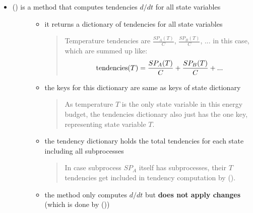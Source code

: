 \documentclass[a4paper,10pt,english]{sphinxmanual}
\begin{document}
\begin{itemize}
\item {} \begin{description}
\item[{{\hyperref[api/climlab.process:climlab.process.time_dependent_process.TimeDependentProcess.compute]{\emph{}}} () is a method that computes tendencies \(d/dt\) for all state variables}] \leavevmode\begin{itemize}
\item {} 
it returns a dictionary of tendencies for all state variables
\begin{quote}

Temperature tendencies are \(\frac{SP_A(T)}{C}\), \(\frac{SP_B(T)}{C}\), ... in this case, which are summed up like:
\begin{gather}
\begin{split}\textrm{tendencies}(T) = \frac{SP_A(T)}{C} + \frac{SP_B(T)}{C} + ...\end{split}\notag
\end{gather}\end{quote}

\item {} 
the keys for this dictionary are same as keys of state dictionary
\begin{quote}

As temperature \(T\) is the only state variable in this energy budget, the tendencies dictionary also just has the one key, representing state variable \(T\).
\end{quote}

\item {} 
the tendency dictionary holds the total tendencies for each state including all subprocesses
\begin{quote}

In case subprocess \(SP_A\) itself has subprocesses, their \(T\) tendencies get included in tendency computation by {\hyperref[api/climlab.process:climlab.process.time_dependent_process.TimeDependentProcess.compute]{\emph{}}} ().
\end{quote}

\item {} 
the method only computes \(d/dt\) but \textbf{does not apply changes} (which is done by {\hyperref[api/climlab.process:climlab.process.time_dependent_process.TimeDependentProcess.step_forward]{\emph{}}} ())


\end{itemize}
\end{description}
\end{itemize}
\end{document}
